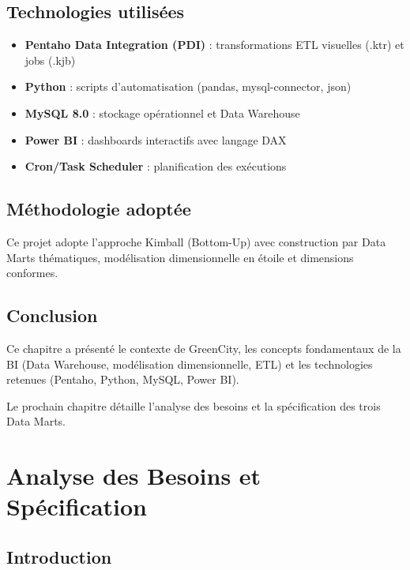 \documentclass[12pt,a4paper]{report}
\begin{document}
\section{Technologies utilisées}

\begin{itemize}
    \item \textbf{Pentaho Data Integration (PDI)} : transformations ETL visuelles (.ktr) et jobs (.kjb)
    \item \textbf{Python} : scripts d'automatisation (pandas, mysql-connector, json)
    \item \textbf{MySQL 8.0} : stockage opérationnel et Data Warehouse
    \item \textbf{Power BI} : dashboards interactifs avec langage DAX
    \item \textbf{Cron/Task Scheduler} : planification des exécutions
\end{itemize}

\section{Méthodologie adoptée}

Ce projet adopte l'approche Kimball (Bottom-Up) avec construction par Data Marts thématiques, modélisation dimensionnelle en étoile et dimensions conformes.

\section{Conclusion}

Ce chapitre a présenté le contexte de GreenCity, les concepts fondamentaux de la BI (Data Warehouse, modélisation dimensionnelle, ETL) et les technologies retenues (Pentaho, Python, MySQL, Power BI).

Le prochain chapitre détaille l'analyse des besoins et la spécification des trois Data Marts.

\cleardoublepage



\chapter{Analyse des Besoins et Spécification}

\section{Introduction}
\end{document}
